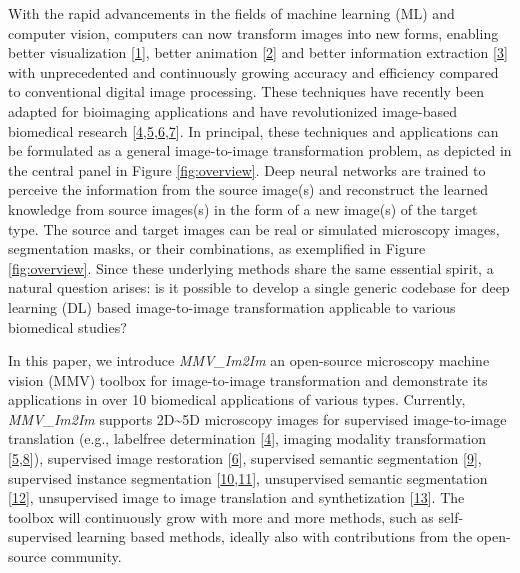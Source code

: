 With the rapid advancements in the fields of machine learning (ML) and computer vision, computers can now transform images into new forms, enabling better visualization {[}\protect\hyperlink{ref-1O0bopKD}{1}{]}, better animation {[}\protect\hyperlink{ref-LxlUp436}{2}{]} and better information extraction {[}\protect\hyperlink{ref-11chATuF4}{3}{]} with unprecedented and continuously growing accuracy and efficiency compared to conventional digital image processing.
These techniques have recently been adapted for bioimaging applications and have revolutionized image-based biomedical research {[}\protect\hyperlink{ref-Yq8wZ6hc}{4},\protect\hyperlink{ref-WwenuBHa}{5},\protect\hyperlink{ref-wcCVn8av}{6},\protect\hyperlink{ref-xPgDok51}{7}{]}. In principal, these techniques and applications can be formulated as a general image-to-image transformation problem, as depicted in the central panel in Figure \ref{fig:overview}. Deep neural networks are trained to perceive the information from the source image(s) and reconstruct the learned knowledge from source images(s) in the form of a new image(s) of the target type.
The source and target images can be real or simulated microscopy images, segmentation masks, or their combinations, as exemplified in Figure \ref{fig:overview}.
Since these underlying methods share the same essential spirit, a natural question arises: is it possible to develop a single generic codebase for deep learning (DL) based image-to-image transformation applicable to various biomedical studies?

In this paper, we introduce \emph{MMV\_Im2Im} an open-source microscopy machine vision (MMV) toolbox for image-to-image transformation and demonstrate its applications in over 10 biomedical applications of various types.
Currently, \emph{MMV\_Im2Im} supports 2D\textasciitilde5D microscopy images for supervised image-to-image translation (e.g., labelfree determination {[}\protect\hyperlink{ref-Yq8wZ6hc}{4}{]}, imaging modality transformation {[}\protect\hyperlink{ref-WwenuBHa}{5},\protect\hyperlink{ref-UEBDZ3tI}{8}{]}), supervised image restoration {[}\protect\hyperlink{ref-wcCVn8av}{6}{]}, supervised semantic segmentation {[}\protect\hyperlink{ref-TutLhFSz}{9}{]}, supervised instance segmentation {[}\protect\hyperlink{ref-K2ugNcVa}{10},\protect\hyperlink{ref-QmYuUQ5K}{11}{]}, unsupervised semantic segmentation {[}\protect\hyperlink{ref-RuFP3CS3}{12}{]}, unsupervised image to image translation and synthetization {[}\protect\hyperlink{ref-6wtIu4QY}{13}{]}. The toolbox will continuously grow with more and more methods, such as self-supervised learning based methods, ideally also with contributions from the open-source community.

